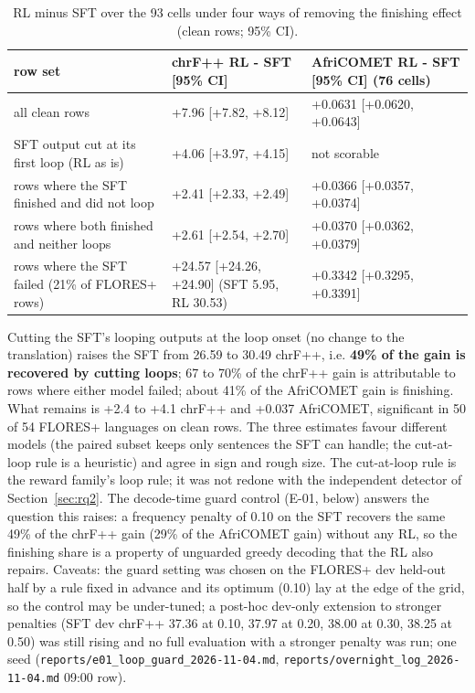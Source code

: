 \begin{table}[t]
\centering\footnotesize
\setlength{\tabcolsep}{4pt}
\caption{RL minus SFT over the 93 cells under four ways of removing the finishing effect (clean rows; 95\% CI).}\label{tab:decomp}
\begin{tabularx}{\linewidth}{@{}>{\raggedright\arraybackslash}X>{\raggedright\arraybackslash}X>{\raggedright\arraybackslash}X@{}}
\toprule
row set & chrF++ RL - SFT [95\% CI] & AfriCOMET RL - SFT [95\% CI] (76 cells) \\
\midrule
all clean rows & +7.96 [+7.82, +8.12] & +0.0631 [+0.0620, +0.0643] \\
SFT output cut at its first loop (RL as is) & +4.06 [+3.97, +4.15] & not scorable \\
rows where the SFT finished and did not loop & +2.41 [+2.33, +2.49] & +0.0366 [+0.0357, +0.0374] \\
rows where both finished and neither loops & +2.61 [+2.54, +2.70] & +0.0370 [+0.0362, +0.0379] \\
rows where the SFT failed (21\% of FLORES+ rows) & +24.57 [+24.26, +24.90] (SFT 5.95, RL 30.53) & +0.3342 [+0.3295, +0.3391] \\
\bottomrule
\end{tabularx}
\end{table}

 Cutting the SFT's looping outputs at the loop onset (no change to the translation) raises the SFT from 26.59 to 30.49 chrF++, i.e. \textbf{49\% of the gain is recovered by cutting loops}; 67 to 70\% of the chrF++ gain is attributable to rows where either model failed; about 41\% of the AfriCOMET gain is finishing. What remains is +2.4 to +4.1 chrF++ and +0.037 AfriCOMET, significant in 50 of 54 FLORES+ languages on clean rows. The three estimates favour different models (the paired subset keeps only sentences the SFT can handle; the cut-at-loop rule is a heuristic) and agree in sign and rough size. The cut-at-loop rule is the reward family's loop rule; it was not redone with the independent detector of Section~\ref{sec:rq2}. The decode-time guard control (E-01, below) answers the question this raises: a frequency penalty of 0.10 on the SFT recovers the same 49\% of the chrF++ gain (29\% of the AfriCOMET gain) without any RL, so the finishing share is a property of unguarded greedy decoding that the RL also repairs. Caveats: the guard setting was chosen on the FLORES+ dev held-out half by a rule fixed in advance and its optimum (0.10) lay at the edge of the grid, so the control may be under-tuned; a post-hoc dev-only extension to stronger penalties (SFT dev chrF++ 37.36 at 0.10, 37.97 at 0.20, 38.00 at 0.30, 38.25 at 0.50) was still rising and no full evaluation with a stronger penalty was run; one seed (\texttt{reports/\allowbreak{}e01\_\allowbreak{}loop\_\allowbreak{}guard\_\allowbreak{}2026-\allowbreak{}11-\allowbreak{}04.\allowbreak{}md}, \texttt{reports/\allowbreak{}overnight\_\allowbreak{}log\_\allowbreak{}2026-\allowbreak{}11-\allowbreak{}04.\allowbreak{}md} 09:00 row).

